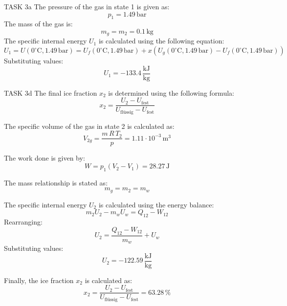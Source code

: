 TASK 3a  
The pressure of the gas in state 1 is given as:  
\[
p_1 = 1.49 \, \text{bar}
\]  
The mass of the gas is:  
\[
m_g = m_2 = 0.1 \, \text{kg}
\]  
The specific internal energy \( U_1 \) is calculated using the following equation:  
\[
U_1 = U(0^\circ\text{C}, 1.49 \, \text{bar}) = U_f(0^\circ\text{C}, 1.49 \, \text{bar}) + x(U_g(0^\circ\text{C}, 1.49 \, \text{bar}) - U_f(0^\circ\text{C}, 1.49 \, \text{bar}))
\]  
Substituting values:  
\[
U_1 = -133.4 \, \frac{\text{kJ}}{\text{kg}}
\]  

TASK 3d  
The final ice fraction \( x_2 \) is determined using the following formula:  
\[
x_2 = \frac{U_2 - U_{\text{fest}}}{U_{\text{flüssig}} - U_{\text{fest}}}
\]  

The specific volume of the gas in state 2 is calculated as:  
\[
V_{2g} = \frac{m \, R \, T_2}{p} = 1.11 \cdot 10^{-3} \, \text{m}^3
\]  

The work done is given by:  
\[
W = p_1 (V_2 - V_1) = 28.27 \, \text{J}
\]  

The mass relationship is stated as:  
\[
m_g = m_2 = m_w
\]  

The specific internal energy \( U_2 \) is calculated using the energy balance:  
\[
m_2 U_2 - m_w U_w = Q_{12} - W_{12}
\]  
Rearranging:  
\[
U_2 = \frac{Q_{12} - W_{12}}{m_w} + U_w
\]  
Substituting values:  
\[
U_2 = -122.59 \, \frac{\text{kJ}}{\text{kg}}
\]  

Finally, the ice fraction \( x_2 \) is calculated as:  
\[
x_2 = \frac{U_2 - U_{\text{fest}}}{U_{\text{flüssig}} - U_{\text{fest}}} = 63.28 \, \%
\]